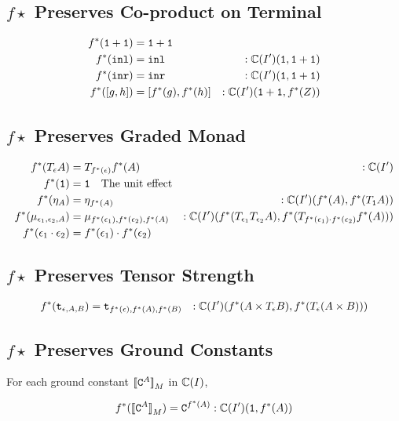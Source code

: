 {\subsection{$f\star$ Preserves Co-product on Terminal}

\begin{align}
    f^*(\texttt{1}+\texttt{1}) &= \texttt{1}+\texttt{1}\\
    f^*(\texttt{inl})  &= \texttt{inl}&:\mathbb{C}(I')(\texttt{1}, \texttt{1}+\texttt{1}) \\
    f^*(\texttt{inr}) &= \texttt{inr}&:\mathbb{C}(I')(\texttt{1}, \texttt{1}+\texttt{1}) \\
    f^*([g, h]) &= [f^*(g), f^*(h)]&:\mathbb{C}(I')(\texttt{1}+\texttt{1}, f^*(Z))
\end{align}

\subsection{$f\star$ Preserves Graded Monad}
\begin{align}
    f^*(T_{\epsilon}{A}) &= T_{f^*(\epsilon)}{f^*(A)}&:\mathbb{C}(I')\\
    f^*(\texttt{1}) &= \texttt{1} \quad\text{The unit effect}\\
    f^*(\eta_{A}) &= \eta_{f^*(A)}&:\mathbb{C}(I')(f^*(A), f^*(T_{\texttt{1}}{A}))\\
    f^*(\mu_{\epsilon_1, \epsilon_2, A}) &= \mu_{f^*(\epsilon_1), f^*(\epsilon_2), f^*(A)}&:\mathbb{C}(I')(f^*(T_{\epsilon_1}{T_{\epsilon_2}{A}}), f^*(T_{f^*(\epsilon_1)\cdot f^*(\epsilon_2)}{f^*(A)}))\\
    f^*(\epsilon_1\cdot\epsilon_2) &= f^*(\epsilon_1)\cdot f^*(\epsilon_2)\\
\end{align}

\subsection{$f\star$ Preserves Tensor Strength}
\begin{align}
    f^*(\texttt{t}_{\epsilon, A, B}) &= \texttt{t}_{f^*(\epsilon), f^*(A), f^*(B)} &: \mathbb{C}(I')(f^*(A\times T_{\epsilon}{B}), f^*(T_{\epsilon}{(A\times B)}))
\end{align}
\subsection{$f\star$ Preserves Ground Constants}
For each ground constant ${\bf [\![}\texttt{C}^{A}{\bf ]\!]}_M$ in $\mathbb{C}(I)$,

\begin{align}
    f^*({\bf [\![}\texttt{C}^{A}{\bf ]\!]}_M) = \texttt{C}^{f^*(A)} : \mathbb{C}(I')(\texttt{1}, f^*(A))
\end{align}
}
